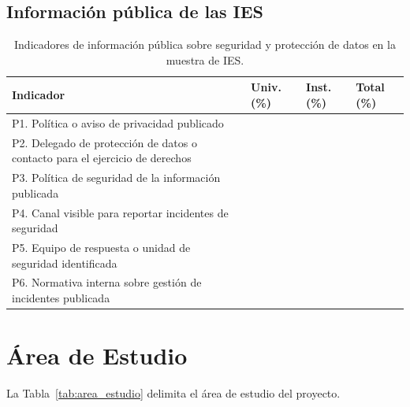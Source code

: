 \subsection{Información pública de las IES}

\begin{table}[htbp]
  \centering
  \caption{Indicadores de información pública sobre seguridad y protección de datos en la muestra de IES.}
  \label{tab:resultados_diagnostico}
  \small
  \begin{tabular}{|L{\tabcolsep}|L{\tabcolsep}|L{\tabcolsep}|L{\tabcolsep}|}
    \hline
    \textbf{Indicador} & \textbf{Univ. (\%)} & \textbf{Inst. (\%)} & \textbf{Total (\%)} \\
    \hline
    P1. Política o aviso de privacidad publicado & & & \\
    \hline
    P2. Delegado de protección de datos o contacto para el ejercicio de derechos & & & \\
    \hline
    P3. Política de seguridad de la información publicada & & & \\
    \hline
    P4. Canal visible para reportar incidentes de seguridad & & & \\
    \hline
    P5. Equipo de respuesta o unidad de seguridad identificada & & & \\
    \hline
    P6. Normativa interna sobre gestión de incidentes publicada & & & \\
    \hline
  \end{tabular}
  \par\normalsize\raggedright
\end{table}

\section{Área de Estudio}
La Tabla~\ref{tab:area_estudio} delimita el área de estudio del proyecto.


